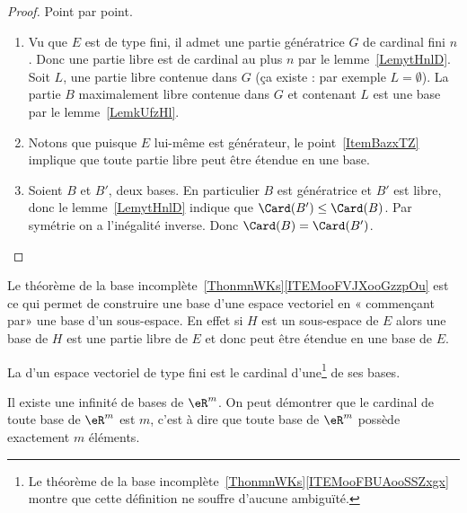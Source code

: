 \begin{proof}
    Point par point.
    \begin{enumerate}
        \item
    Vu que \( E\) est de type fini, il admet une partie génératrice \( G\) de cardinal fini \( n\). Donc une partie libre est de cardinal au plus \( n\) par le lemme~\ref{LemytHnlD}. Soit \( L\), une partie libre contenue dans \( G\) (ça existe : par exemple \( L=\emptyset\)). La partie \( B\) maximalement libre contenue dans \( G\) et contenant \( L\) est une base par le lemme~\ref{LemkUfzHl}.
\item
Notons que puisque \( E\) lui-même est générateur, le point~\ref{ItemBazxTZ} implique que toute partie libre peut être étendue en une base.
\item
    Soient \( B\) et \( B'\), deux bases. En particulier \( B\) est génératrice et \( B'\) est libre, donc le lemme~\ref{LemytHnlD} indique que \( \Card(B')\leq \Card(B)\). Par symétrie on a l'inégalité inverse. Donc \( \Card(B)=\Card(B')\).
    \end{enumerate}
\end{proof}

\begin{remark}      \label{REMooYGJEooEcZQKa}
    Le théorème de la base incomplète~\ref{ThonmnWKs}\ref{ITEMooFVJXooGzzpOu} est ce qui permet de construire une base d'une espace vectoriel en « commençant par» une base d'un sous-espace. En effet si \( H\) est un sous-espace de \( E\) alors une base de \( H\) est une partie libre de \( E\) et donc peut être étendue en une base de \( E\).
\end{remark}

\begin{definition}      \label{DEFooWRLKooArTpgh}
    La  d'un espace vectoriel de type fini est le cardinal d'une\footnote{Le théorème de la base incomplète~\ref{ThonmnWKs}\ref{ITEMooFBUAooSSZxgx} montre que cette définition ne souffre d'aucune ambiguïté.} de ses bases.
\end{definition}

Il existe une infinité de bases de $\eR^m$. On peut démontrer que le cardinal de toute base de $\eR^m$ est $m$, c'est à dire que toute base de $\eR^m$ possède exactement $m$ éléments.

